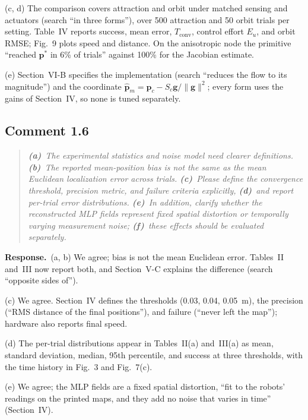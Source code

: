 \documentclass[10pt]{article}
\newcommand{\rev}[1]{#1}                             %
\newcommand{\resp}{\par\textbf{Response.}~}
\begin{document}
(c, d) The comparison covers attraction and orbit under matched sensing and actuators (search ``in three forms''), over \rev{500} attraction and \rev{50} orbit trials per setting. Table~IV reports success, mean error, $T_{\mathrm{conv}}$, control effort $E_u$, and orbit RMSE; Fig.~9 plots speed and distance. On the anisotropic node the primitive ``reached $\mathbf{p}^*$ in \rev{6}\% of trials'' against 100\% for the Jacobian estimate.

(e) Section~VI-B specifies the implementation (search ``reduces the flow to its magnitude'') and the coordinate $\hat{\mathbf{p}}_m = \mathbf{p}_c - S_c\mathbf{g}/\|\mathbf{g}\|^2$; every form uses the gains of Section~IV, so none is tuned separately.

\subsection*{Comment 1.6}

\begin{quote}\itshape
\textbf{(a)}~The experimental statistics and noise model need clearer definitions.
\textbf{(b)}~The reported mean-position bias is not the same as the mean Euclidean localization error across trials.
\textbf{(c)}~Please define the convergence threshold, precision metric, and failure criteria explicitly,
\textbf{(d)}~and report per-trial error distributions.
\textbf{(e)}~In addition, clarify whether the reconstructed MLP fields represent fixed spatial distortion or temporally varying measurement noise;
\textbf{(f)}~these effects should be evaluated separately.
\end{quote}

\resp (a, b) We agree; bias is not the mean Euclidean error. Tables~II and~III now report both, and Section~V-C explains the difference (search ``opposite sides of'').

(c) We agree. Section~IV defines the thresholds (0.03, 0.04, 0.05~m), the precision (``RMS distance of the final positions''), and failure (``never left the map''); hardware also reports final speed.

(d) The per-trial distributions appear in Tables~II(a) and~III(a) as mean, standard deviation, median, 95th percentile, and success at three thresholds, with the time history in Fig.~3 and \rev{Fig.~7(c)}.

(e) We agree; the MLP fields are a fixed spatial distortion, ``fit to the robots' readings on the printed maps, and they add no noise that varies in time'' (Section~IV).
\end{document}
